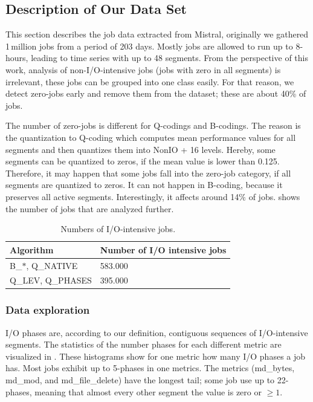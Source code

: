 \documentclass{jhps}
\begin{document}
\subsection{Description of Our Data Set}
This section describes the job data extracted from Mistral, originally we gathered 1\,million jobs from a period of 203 days.
Mostly jobs are allowed to run up to 8-hours, leading to time series with up to 48 segments.
From the perspective of this work, analysis of non-I/O-intensive jobs (jobs with zero in all segments) is irrelevant, these jobs can be grouped into one class easily.
For that reason, we detect zero-jobs early and remove them from the dataset; these are about 40\% of jobs.

The number of zero-jobs is different for Q-codings and B-codings.
The reason is the quantization to Q-coding which computes mean performance values for all segments and then quantizes them into NonIO + 16 levels.
Hereby, some segments can be quantized to zeros, if the mean value is lower than 0.125.
Therefore, it may happen that some jobs fall into the zero-job category, if all segments are quantized to zeros.
It can not happen in B-coding, because it preserves all active segments.
Interestingly, it affects around 14$\%$ of jobs.
 shows the number of jobs that are analyzed further.

\begin{table}
  \centering
  \begin{tabular}{ll}
    Algorithm & Number of I/O intensive jobs \\
    \midrule
    B\_$\ast$, Q\_NATIVE &  583.000 \\
    Q\_LEV, Q\_PHASES &  395.000 \\
  \end{tabular}
  \caption{Numbers of I/O-intensive jobs.}
  \label{tab:n_intensive_jobs}
\end{table}


\subsubsection{Data exploration}
I/O phases are, according to our definition, contiguous sequences of I/O-intensive segments.
The statistics of the number phases for each different metric are visualized in .
These histograms show for one metric how many I/O phases a job has.
Most jobs exhibit up to 5-phases in one metrics.
The metrics (md\_bytes, md\_mod, and md\_file\_delete) have the longest tail; some job use up to 22-phases, meaning that almost every other segment the value is zero or $\geq 1$.
\end{document}

